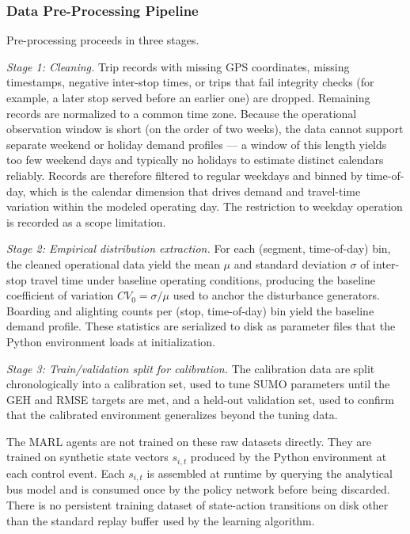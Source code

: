\subsubsection{Data Pre-Processing Pipeline}
\label{subsec:data-pipeline}

Pre-processing proceeds in three stages.

\textit{Stage 1: Cleaning.} Trip records with missing GPS coordinates, missing timestamps, negative inter-stop times, or trips that fail integrity checks (for example, a later stop served before an earlier one) are dropped. Remaining records are normalized to a common time zone. Because the operational observation window is short (on the order of two weeks), the data cannot support separate weekend or holiday demand profiles --- a window of this length yields too few weekend days and typically no holidays to estimate distinct calendars reliably. Records are therefore filtered to regular weekdays and binned by time-of-day, which is the calendar dimension that drives demand and travel-time variation within the modeled operating day. The restriction to weekday operation is recorded as a scope limitation.

\textit{Stage 2: Empirical distribution extraction.} For each (segment, time-of-day) bin, the cleaned operational data yield the mean $\mu$ and standard deviation $\sigma$ of inter-stop travel time under baseline operating conditions, producing the baseline coefficient of variation $CV_0 = \sigma / \mu$ used to anchor the disturbance generators. Boarding and alighting counts per (stop, time-of-day) bin yield the baseline demand profile. These statistics are serialized to disk as parameter files that the Python environment loads at initialization.

\textit{Stage 3: Train/validation split for calibration.} The calibration data are split chronologically into a calibration set, used to tune SUMO parameters until the GEH and RMSE targets are met, and a held-out validation set, used to confirm that the calibrated environment generalizes beyond the tuning data.

The MARL agents are not trained on these raw datasets directly. They are trained on synthetic state vectors $s_{i,t}$ produced by the Python environment at each control event. Each $s_{i,t}$ is assembled at runtime by querying the analytical bus model and is consumed once by the policy network before being discarded. There is no persistent training dataset of state-action transitions on disk other than the standard replay buffer used by the learning algorithm.

